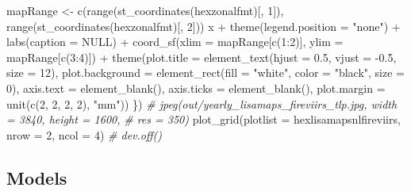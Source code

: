 \documentclass[10pt,landscape,a3paper]{article}
\newenvironment{Shaded}{\begin{snugshade}}{\end{snugshade}}
\newcommand{\AttributeTok}[1]{\textcolor[rgb]{0.77,0.63,0.00}{#1}}
\newcommand{\CommentTok}[1]{\textcolor[rgb]{0.56,0.35,0.01}{\textit{#1}}}
\newcommand{\ConstantTok}[1]{\textcolor[rgb]{0.00,0.00,0.00}{#1}}
\newcommand{\DecValTok}[1]{\textcolor[rgb]{0.00,0.00,0.81}{#1}}
\newcommand{\FloatTok}[1]{\textcolor[rgb]{0.00,0.00,0.81}{#1}}
\newcommand{\FunctionTok}[1]{\textcolor[rgb]{0.00,0.00,0.00}{#1}}
\newcommand{\NormalTok}[1]{#1}
\newcommand{\OtherTok}[1]{\textcolor[rgb]{0.56,0.35,0.01}{#1}}
\newcommand{\SpecialCharTok}[1]{\textcolor[rgb]{0.00,0.00,0.00}{#1}}
\newcommand{\StringTok}[1]{\textcolor[rgb]{0.31,0.60,0.02}{#1}}
\begin{document}
\begin{Shaded}
\begin{Highlighting}[]
\NormalTok{    mapRange }\OtherTok{\textless{}{-}} \FunctionTok{c}\NormalTok{(}\FunctionTok{range}\NormalTok{(}\FunctionTok{st\_coordinates}\NormalTok{(hexzonalfmt)[, }\DecValTok{1}\NormalTok{]), }\FunctionTok{range}\NormalTok{(}\FunctionTok{st\_coordinates}\NormalTok{(hexzonalfmt)[,}
        \DecValTok{2}\NormalTok{]))}
\NormalTok{    x }\SpecialCharTok{+} \FunctionTok{theme}\NormalTok{(}\AttributeTok{legend.position =} \StringTok{"none"}\NormalTok{) }\SpecialCharTok{+} \FunctionTok{labs}\NormalTok{(}\AttributeTok{caption =} \ConstantTok{NULL}\NormalTok{) }\SpecialCharTok{+} \FunctionTok{coord\_sf}\NormalTok{(}\AttributeTok{xlim =}\NormalTok{ mapRange[}\FunctionTok{c}\NormalTok{(}\DecValTok{1}\SpecialCharTok{:}\DecValTok{2}\NormalTok{)],}
        \AttributeTok{ylim =}\NormalTok{ mapRange[}\FunctionTok{c}\NormalTok{(}\DecValTok{3}\SpecialCharTok{:}\DecValTok{4}\NormalTok{)]) }\SpecialCharTok{+} \FunctionTok{theme}\NormalTok{(}\AttributeTok{plot.title =} \FunctionTok{element\_text}\NormalTok{(}\AttributeTok{hjust =} \FloatTok{0.5}\NormalTok{, }\AttributeTok{vjust =} \SpecialCharTok{{-}}\FloatTok{0.5}\NormalTok{,}
        \AttributeTok{size =} \DecValTok{12}\NormalTok{), }\AttributeTok{plot.background =} \FunctionTok{element\_rect}\NormalTok{(}\AttributeTok{fill =} \StringTok{"white"}\NormalTok{, }\AttributeTok{color =} \StringTok{"black"}\NormalTok{,}
        \AttributeTok{size =} \DecValTok{0}\NormalTok{), }\AttributeTok{axis.text =} \FunctionTok{element\_blank}\NormalTok{(), }\AttributeTok{axis.ticks =} \FunctionTok{element\_blank}\NormalTok{(), }\AttributeTok{plot.margin =} \FunctionTok{unit}\NormalTok{(}\FunctionTok{c}\NormalTok{(}\DecValTok{2}\NormalTok{,}
        \DecValTok{2}\NormalTok{, }\DecValTok{2}\NormalTok{, }\DecValTok{2}\NormalTok{), }\StringTok{"mm"}\NormalTok{))}
\NormalTok{\})}
\CommentTok{\# jpeg(\textquotesingle{}out/yearly\_lisamaps\_fireviirs\_tlp.jpg\textquotesingle{}, width = 3840, height = 1600,}
\CommentTok{\# res = 350)}
\FunctionTok{plot\_grid}\NormalTok{(}\AttributeTok{plotlist =}\NormalTok{ hexlisamapsnlfireviirs, }\AttributeTok{nrow =} \DecValTok{2}\NormalTok{, }\AttributeTok{ncol =} \DecValTok{4}\NormalTok{)}
\CommentTok{\# dev.off()}
\end{Highlighting}
\end{Shaded}

\hypertarget{models}{%
\subsection{Models}\label{models}}
\end{document}
